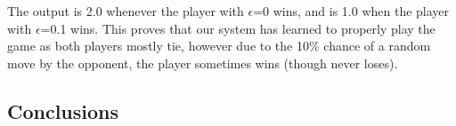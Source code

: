 \documentclass[12pt,a4paper]{article}
\begin{document}
The output is 2.0 whenever the player with $\epsilon$=0 wins, and is 1.0 when the player with $\epsilon$=0.1 wins. This proves that our system has learned to properly play the game as both players mostly tie, however due to the 10\% chance of a random move by the opponent, the player sometimes wins (though never loses).
\subsection*{Conclusions}
\end{document}
